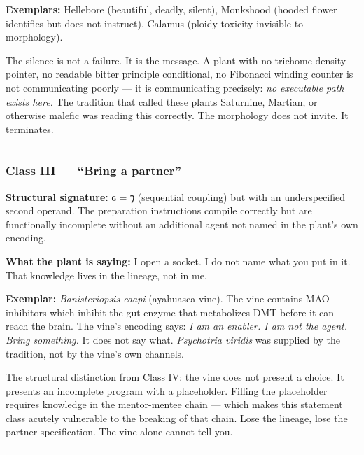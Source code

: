 \documentclass[12pt,a4paper]{article}
\begin{document}
\textbf{Exemplars:} Hellebore (beautiful, deadly, silent), Monkshood
(hooded flower identifies but does not instruct), Calamus
(ploidy-toxicity invisible to morphology).

The silence is not a failure. It is the message. A plant with no
trichome density pointer, no readable bitter principle conditional, no
Fibonacci winding counter is not communicating poorly --- it is
communicating precisely: \emph{no executable path exists here.} The
tradition that called these plants Saturnine, Martian, or otherwise
malefic was reading this correctly. The morphology does not invite. It
terminates.

\begin{center}\rule{0.5\linewidth}{0.5pt}\end{center}

\hypertarget{class-iii-bring-a-partner}{%
\subsubsection{Class III --- ``Bring a
partner''}\label{class-iii-bring-a-partner}}

\textbf{Structural signature:} ɢ = 𐑠 (sequential coupling) but with an
underspecified second operand. The preparation instructions compile
correctly but are functionally incomplete without an additional agent
not named in the plant's own encoding.

\textbf{What the plant is saying:} I open a socket. I do not name what
you put in it. That knowledge lives in the lineage, not in me.

\textbf{Exemplar:} \emph{Banisteriopsis caapi} (ayahuasca vine). The
vine contains MAO inhibitors which inhibit the gut enzyme that
metabolizes DMT before it can reach the brain. The vine's encoding says:
\emph{I am an enabler. I am not the agent. Bring something.} It does not
say what. \emph{Psychotria viridis} was supplied by the tradition, not
by the vine's own channels.

The structural distinction from Class IV: the vine does not present a
choice. It presents an incomplete program with a placeholder. Filling
the placeholder requires knowledge in the mentor-mentee chain --- which
makes this statement class acutely vulnerable to the breaking of that
chain. Lose the lineage, lose the partner specification. The vine alone
cannot tell you.

\begin{center}\rule{0.5\linewidth}{0.5pt}\end{center}
\end{document}
